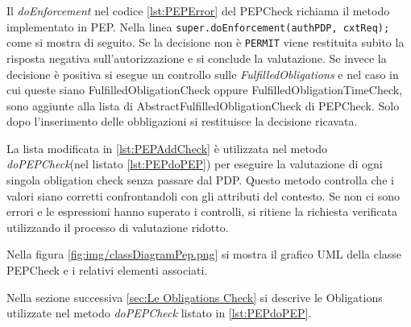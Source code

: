 Il \emph{doEnforcement} nel codice \ref{lst:PEPError} del PEPCheck richiama il metodo implementato in \ac{PEP}.
Nella linea \texttt{super.doEnforcement(authPDP, cxtReq);} come si mostra di seguito.
Se la decisione non è \texttt{PERMIT} viene restituita subito la risposta negativa sull'autorizzazione e si conclude la valutazione.
Se invece la decisione è positiva si esegue un controllo sulle \emph{FulfilledObligations} e
nel caso in cui queste siano FulfilledObligationCheck oppure FulfilledObligationTimeCheck,
sono aggiunte alla lista di AbstractFulfilledObligationCheck di PEPCheck. Solo dopo l'inserimento delle obbligazioni
si restituisce la decisione ricavata.

La lista modificata in \ref{lst:PEPAddCheck} è utilizzata nel metodo \emph{doPEPCheck}(nel listato \ref{lst:PEPdoPEP})
per eseguire la valutazione di ogni singola obligation check senza passare dal \ac{PDP}.
Questo metodo controlla che i valori siano corretti confrontandoli con gli attributi del contesto. Se non ci
sono errori e le espressioni hanno superato i controlli, si ritiene la richiesta verificata
utilizzando il processo di valutazione ridotto.

Nella figura \ref{fig:img/classDiagramPep.png} si mostra il grafico UML della classe PEPCheck e i relativi elementi
associati.

Nella sezione successiva \ref{sec:Le Obligations Check} si descrive le Obligations utilizzate
nel metodo \emph{doPEPCheck} listato in \ref{lst:PEPdoPEP}.

